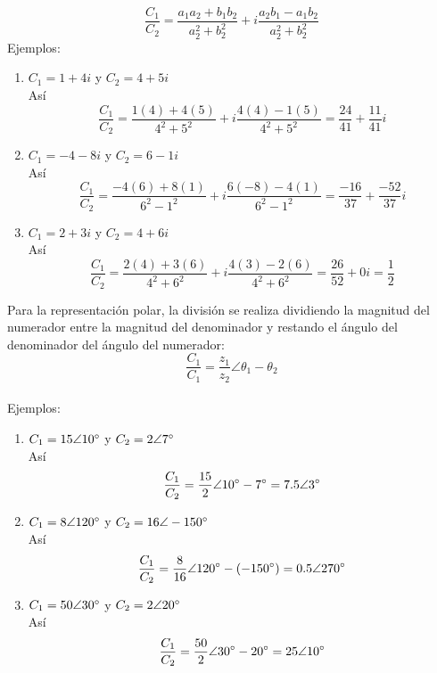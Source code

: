 \documentclass[a4paper,12pt]{article}
\begin{document}
\begin{enumerate}
\begin{enumerate}
	\[\frac{C_1}{C_2} = \frac{a_1 a_2 + b_1 b_2}{a_2 ^2 + b_2 ^2} + i\frac{a_2 b_1 - a_1 b_2}{a_2 ^2 + b_2 ^2}\]
	Ejemplos:\\
		\begin{enumerate}
			\item $C_1 = 1+4i$ y $C_2 = 4+5i$ \\
			Así \[\frac{C_1}{C_2} = \frac{1(4) + 4(5)}{4^2 + 5^2} + i\frac{4(4) - 1(5)}{4^2 + 5^2} = \frac{24}{41} + \frac{11}{41}i\]
			\item $C_1 = -4-8i$ y $C_2 = 6-1i$ \\
			Así \[\frac{C_1}{C_2} = \frac{-4(6) + 8(1)}{6^2 - 1^2} + i\frac{6(-8) - 4(1)}{6^2 - 1^2} = \frac{-16}{37} + \frac{-52}{37}i\]
			\item $C_1 = 2+3i$ y $C_2 = 4+6i$ \\
			Así \[\frac{C_1}{C_2} = \frac{2(4) + 3(6)}{4^2 + 6^2} + i\frac{4(3) - 2(6)}{4^2 + 6^2} = \frac{26}{52} + 0i = \frac{1}{2}\]
		\end{enumerate}
	Para la representación polar, la división se realiza  dividiendo la magnitud del numerador entre la magnitud del denominador y restando el ángulo del denominador del ángulo del numerador:
	\[\frac{C_1}{C_1} = \frac{z_1}{z_2}\angle {\theta}_1 - {\theta}_2\] \\
	Ejemplos:\\
		\begin{enumerate}
			\item $C_1 = 15 \angle 10\degree$ y $C_2 = 2 \angle 7\degree$ \\
			Así \[\frac{C_1}{C_2} = \frac{15}{2} \angle 10\degree - 7\degree = 7.5 \angle 3\degree\]
			\item $C_1 = 8 \angle 120\degree$ y $C_2 = 16 \angle -150\degree$ \\
			Así \[\frac{C_1}{C_2} = \frac{8}{16} \angle 120\degree - (-150\degree) = 0.5 \angle 270\degree\]
			\item $C_1 = 50 \angle 30\degree$ y $C_2 = 2 \angle 20\degree$ \\
			Así \[\frac{C_1}{C_2} = \frac{50}{2} \angle 30\degree - 20\degree = 25 \angle 10\degree\]
		\end{enumerate}
	\end{enumerate}

\end{enumerate}
\end{document}
